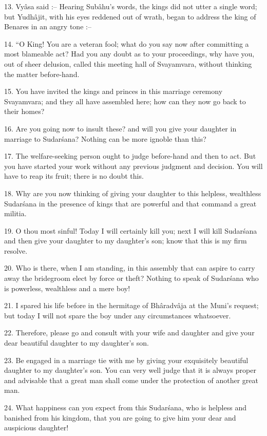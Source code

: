 13. Vy\^asa said :-- Hearing Sub\^ahu's words, the kings did not utter a single word; but Yudh\^ajit, with his eyes reddened out of wrath, began to address the king of Benares in an angry tone :--

14. ``O King! You are a veteran fool; what do you say now after committing a most blameable act? Had you any doubt as to your proceedings, why have you, out of sheer delusion, called this meeting hall of Svayamvara, without thinking the matter before-hand.

15. You have invited the kings and princes in this marriage ceremony Svayamvara; and they all have assembled here; how can they now go back to their homes?

16. Are you going now to insult these? and will you give your daughter in marriage to Sudar\'sana? Nothing can be more ignoble than this?

17. The welfare-seeking person ought to judge before-hand and then to act. But you have started your work without any previous judgment and decision. You will have to reap its fruit; there is no doubt this.

18. Why are you now thinking of giving your daughter to this helpless, wealthless Sudar\'sana in the presence of kings that are powerful and that command a great militia.

19. O thou most sinful! Today I will certainly kill you; next I will kill Sudar\'sana and then give your daughter to my daughter's son; know that this is my firm resolve.

20. Who is there, when I am standing, in this assembly that can aspire to carry away the bridegroom elect by force or theft? Nothing to speak of Sudar\'sana who is powerless, wealthless and a mere boy!

21. I spared his life before in the hermitage of Bh\^aradv\^aja at the Muni's request; but today I will not spare the boy under any circumstances whatsoever.

22. Therefore, please go and consult with your wife and daughter and give your dear beautiful daughter to my daughter's son.

23. Be engaged in a marriage tie with me by giving your exquisitely beautiful daughter to my daughter's son. You can very well judge that it is always proper and advisable that a great man shall come under the protection of another great man.

24. What happiness can you expect from this Sudar\'sana, who is helpless and banished from his kingdom, that you are going to give him your dear and auspicious daughter!

